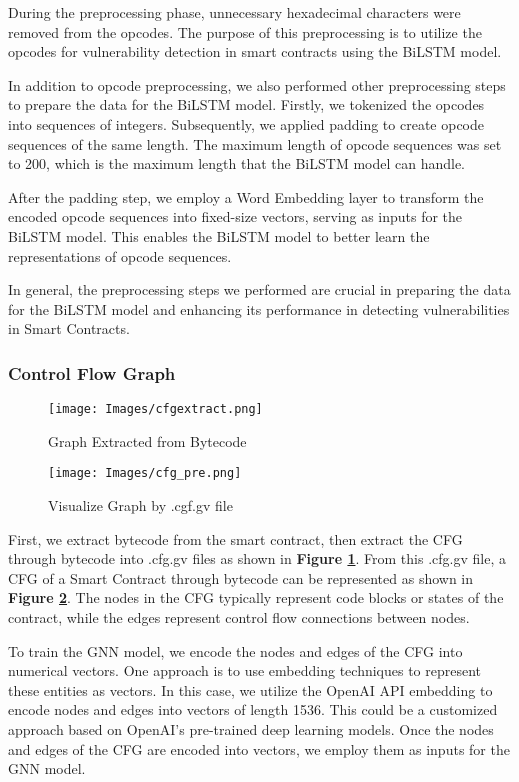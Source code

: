 During the preprocessing phase, unnecessary hexadecimal characters were removed from the opcodes. The purpose of this preprocessing is to utilize the opcodes for vulnerability detection in smart contracts using the BiLSTM model.

In addition to opcode preprocessing, we also performed other preprocessing steps to prepare the data for the BiLSTM model. Firstly, we tokenized the opcodes into sequences of integers. Subsequently, we applied padding to create opcode sequences of the same length. The maximum length of opcode sequences was set to 200, which is the maximum length that the BiLSTM model can handle.

After the padding step, we employ a Word Embedding layer to transform the encoded opcode sequences into fixed-size vectors, serving as inputs for the BiLSTM model. This enables the BiLSTM model to better learn the representations of opcode sequences.

In general, the preprocessing steps we performed are crucial in preparing the data for the BiLSTM model and enhancing its performance in detecting vulnerabilities in Smart Contracts.

\subsubsection{Control Flow Graph}
\begin{figure}[h]
\centering
\texttt{[image: Images/cfgextract.png]}
\caption{Graph Extracted from Bytecode} \label{code:cfgextract}
\end{figure}

\begin{figure}[h]
\centering
\texttt{[image: Images/cfg\_pre.png]}
\caption{Visualize Graph by .cgf.gv file } \label{fig:cfg_pre}
\end{figure}
First, we extract bytecode from the smart contract, then extract the CFG through bytecode into .cfg.gv files as shown in \textbf{Figure \ref{code:cfgextract}}. From this .cfg.gv file, a CFG of a Smart Contract through bytecode can be represented as shown in \textbf{Figure \ref{fig:cfg_pre}}. The nodes in the CFG typically represent code blocks or states of the contract, while the edges represent control flow connections between nodes.

To train the GNN model, we encode the nodes and edges of the CFG into numerical vectors. One approach is to use embedding techniques to represent these entities as vectors. In this case, we utilize the OpenAI API embedding to encode nodes and edges into vectors of length 1536. This could be a customized approach based on OpenAI's pre-trained deep learning models. Once the nodes and edges of the CFG are encoded into vectors, we employ them as inputs for the GNN model.

